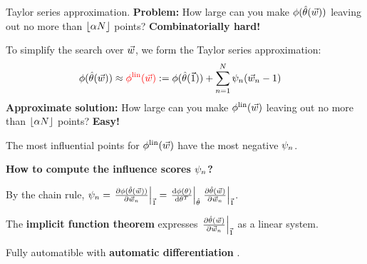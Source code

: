 \begin{frame}{Taylor series approximation.}
%
\textbf{Problem: } How large can you make $\phi(\hat{\theta}(\vec{w}))$
leaving out no more than $\lfloor \alpha N \rfloor$ points?  \textbf{Combinatorially hard!}

\hrulefill

\vspace{1em}
To simplify the search over $\vec{w}$, we form the Taylor series approximation:
%
\begin{align*}
	\phi(\hat{\theta}(\vec{w}))
		&\approx
        \color{red}
        \phi^{\mathrm{lin}}(\vec{w})
        \color{black}
		:=  \phi(\hat{\theta}(\vec{1})) +
        \sum_{n=1}^N \psi_n (\vec{w}_n -1)
        \color{black}
\end{align*}
%
\textbf{Approximate solution: } How large can you make $\phi^{\mathrm{lin}}(\vec{w})$
leaving out no more than $\lfloor \alpha N \rfloor$ points?  \textbf{Easy! }

\vspace{1em}
The most influential points for $\phi^{\mathrm{lin}}(\vec{w})$ have the
most negative $\psi_n$.

\hrulefill

\vspace{1em}
\textbf{How to compute the influence scores $\psi_n$? }

By the chain rule,
$\psi_n = \left.\frac{\partial \phi(\hat{\theta}(\vec{w}))}{\partial \vec{w}_n}\right|_{\vec{1}}
= \left.\frac{\mathrm{d} \phi(\theta)}{\mathrm{d} \theta^T}\right|_{\hat{\theta}}
  \left.\frac{\partial \hat{\theta}(\vec{w})}{\partial \vec{w}_n}\right|_{\vec{1}}$.

The \textbf{implicit function theorem} expresses $\left.\frac{\partial
\hat{\theta}(\vec{w})}{\partial \vec{w}_n}\right|_{\vec{1}}$ as a linear system.

Fully automatible with \textbf{automatic differentiation}
\citep{baydin2017automatic}.

\end{frame}









